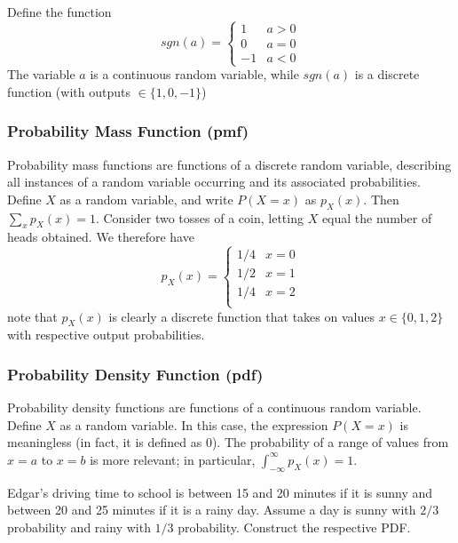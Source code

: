 \documentclass[11pt]{article}
\theoremstyle{definition}
\begin{document}
\example Define the function 
\begin{equation*}
sgn(a) = \begin{cases}
1 &a > 0\\
0 & a = 0 \\
-1 & a < 0
\end{cases}
\end{equation*}
The variable $a$ is a continuous random variable, while $sgn(a)$ is a discrete function (with outputs $\in \{1, 0, -1\}$)
\subsubsection{Probability Mass Function (pmf)}
Probability mass functions are functions of a discrete random variable, describing all instances of a random variable occurring and its associated probabilities. Define $X$ as a random variable, and write $P(X = x)$ as $p_X(x)$. Then $\sum_x p_X(x) = 1$. Consider two tosses of a coin, letting $X$ equal the number of heads obtained. We therefore have 
\begin{equation*}
p_X(x) = \begin{cases}
1/4 & x =0\\
1/2 & x=1\\
1/4 & x=2 \\
\end{cases}
\end{equation*}
note that $p_X(x)$ is clearly a discrete function that takes on values $x \in \{0, 1, 2 \}$ with respective output probabilities. 
\subsubsection{Probability Density Function (pdf)}
Probability density functions are functions of a continuous random variable. Define $X$ as a random variable. In this case, the expression $P(X = x)$ is meaningless (in fact, it is defined as 0). The probability of a range of values from $x = a$ to $x = b$ is more relevant; in particular, $\int_{-\infty}^{\infty}p_X(x) = 1$. 

\example Edgar's driving time to school is between 15 and 20 minutes if it is sunny and between 20 and 25 minutes if it is a rainy day. Assume a day is sunny with $2/3$ probability and rainy with $1/3$ probability. Construct the respective PDF. \\
\end{document}
